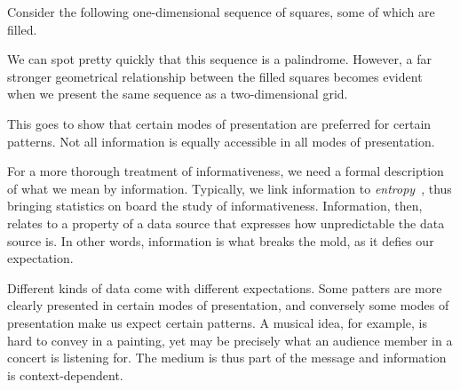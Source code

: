 \begin{example}
  Consider the following one-dimensional sequence of squares, some of which are filled.
  \begin{center}
  \end{center}
  We can spot pretty quickly that this sequence is a palindrome.
  However, a far stronger geometrical relationship between the filled squares becomes evident when we present the same sequence as a two-dimensional grid.
  \begin{center}
  \end{center}
  This goes to show that certain modes of presentation are preferred for certain patterns.
  Not all information is equally accessible in all modes of presentation.
\end{example}

For a more thorough treatment of informativeness, we need a formal description of what we mean by information.
Typically, we link information to \emph{entropy}~\parencite{cover2006elements}, thus bringing statistics on board the study of informativeness.
Information, then, relates to a property of a data source that expresses how unpredictable the data source is.
In other words, information is what breaks the mold, as it defies our expectation.

Different kinds of data come with different expectations.
Some patters are more clearly presented in certain modes of presentation, and conversely some modes of presentation make us expect certain patterns.
A musical idea, for example, is hard to convey in a painting, yet may be precisely what an audience member in a concert is listening for.
The medium is thus part of the message and information is context-dependent.

